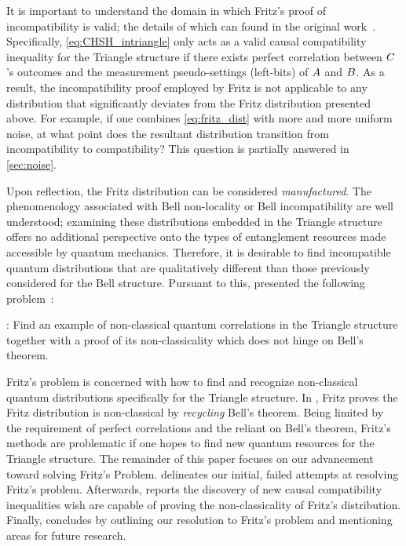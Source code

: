 \documentclass[aps, 10pt, english, twoside, pra, nofootinbib, tightenlines, longbibliography, superscriptaddress]{revtex4-1}
\begin{document}
    It is important to understand the domain in which Fritz's proof of incompatibility is valid; the details of which can found in the original work~\cite{Fritz_2012}. Specifically, \cref{eq:CHSH_intriangle} only acts as a valid causal compatibility inequality for the Triangle structure if there exists perfect correlation between $C$'s outcomes and the measurement pseudo-settings (left-bits) of $A$ and $B$. As a result, the incompatibility proof employed by Fritz is not applicable to any distribution that significantly deviates from the Fritz distribution presented above. For example, if one combines \cref{eq:fritz_dist} with more and more uniform noise, at what point does the resultant distribution transition from incompatibility to compatibility? This question is partially answered in \cref{sec:noise}.

    Upon reflection, the Fritz distribution can be considered \textit{manufactured}. The phenomenology associated with Bell non-locality or Bell incompatibility are well understood; examining these distributions embedded in the Triangle structure offers no additional perspective onto the types of entanglement resources made accessible by quantum mechanics. Therefore, it is desirable to find incompatible quantum distributions that are qualitatively different than those previously considered for the Bell structure. Pursuant to this, \citet{Fritz_2012} presented the following problem~\cite[Problem 2.17]{Fritz_2012}:%

    : Find an example of non-classical quantum correlations in the Triangle structure together with a proof of its non-classicality which does not hinge on Bell’s theorem.

    Fritz's problem is concerned with how to find and recognize non-classical quantum distributions specifically for the Triangle structure. In \cite{Fritz_2012}, Fritz proves the Fritz distribution is non-classical by \textit{recycling} Bell's theorem. Being limited by the requirement of perfect correlations and the reliant on Bell's theorem, Fritz's methods are problematic if one hopes to find new quantum resources for the Triangle structure. The remainder of this paper focuses on our advancement toward solving Fritz's Problem.  delineates our initial, failed attempts at resolving Fritz's problem. Afterwards,  reports the discovery of new causal compatibility inequalities wish are capable of proving the non-classicality of Fritz's distribution. Finally,  concludes by outlining our resolution to Fritz's problem and mentioning areas for future research.
\end{document}
